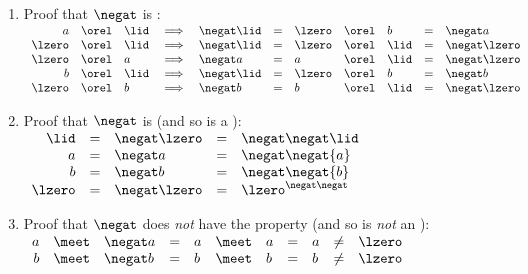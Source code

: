 \begin{proofns}
\begin{enumerate}
  \item Proof that $\negat$ is :
    $\begin{array}[t]{rcl c lcl c lclc}
      a      &\orel& \lid &\implies& \negat\lid &=& \lzero &\orel& b    &=&  \negat a     \\
      \lzero &\orel& \lid &\implies& \negat\lid &=& \lzero &\orel& \lid &=& \negat\lzero \\
      \lzero &\orel& a    &\implies&  \negat a   &=& a      &\orel& \lid &=& \negat\lzero \\
      b      &\orel& \lid &\implies& \negat\lid &=& \lzero &\orel& b    &=&  \negat b     \\
      \lzero &\orel& b    &\implies&  \negat b   &=& b      &\orel& \lid &=& \negat\lzero 
    \end{array}$

  \item Proof that $\negat$ is  (and so is a ):
    $\begin{array}[t]{rcl cl}
      \lid   &=& \negat\lzero &=& \negat\negat\lid   \\
      a      &=& \negat a      &=& \negat\negat{a}      \\
      b      &=& \negat b      &=& \negat\negat{b}      \\
      \lzero &=& \negat\lzero &=& \lzero^{\negat\negat} \\
    \end{array}$

  \item Proof that $\negat$ does \emph{not} have the  property (and so is \emph{not} an ):
    \\$\begin{array}[t]{rcl clclclcl}
      a      &\meet& \negat a      &=& a      &\meet& a      &=& a &\neq& \lzero \\
      b      &\meet& \negat b      &=& b      &\meet& b      &=& b &\neq& \lzero 
    \end{array}$


\end{enumerate}
\end{proofns}
